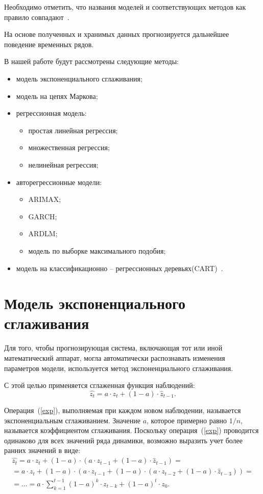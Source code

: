 Необходимо отметить, что названия моделей и соответствующих методов как правило совпадают~\cite{myref9}.

На основе полученных и хранимых данных прогнозируется дальнейшее поведение временных рядов.

В нашей работе будут рассмотрены следующие методы:

\begin{itemize}
\item модель экспоненциального сглаживания;
\item модель на цепях Маркова;
\item регрессионная модель:
    \begin{itemize}
        \item простая линейная регрессия;
        \item множественная регрессия;
        \item нелинейная регрессия;
    \end{itemize}
\item авторегрессионные модели:
\begin{itemize}
    \item ARIMAX;
    \item GARCH;
    \item ARDLM;
    \item модель по выборке максимального подобия;
\end{itemize}
\item модель на классификационно -- регрессионных деревьях(CART)~\cite{myref9}.
\end{itemize}

\section{Модель экспоненциального сглаживания}

Для того, чтобы прогнозирующая система, включающая тот или иной математический аппарат,
могла автоматически распознавать изменения параметров модели, используется метод экспоненциального сглаживания.

С этой целью применяется сглаженная функция наблюдений:
\begin{equation}
    \label{exp}
    \hat{z_t} = a \cdot z_t + (1 - a) \cdot \widehat{z}_{t-1}.
\end{equation}

Операция~(\ref{exp}), выполняемая при каждом новом наблюдении, называется экспоненциальным сглаживанием.
Значение $a$, которое примерно равно $1/n$, называется коэффициентом сглаживания.
Поскольку операция~(\ref{exp}) проводится одинаково для всех значений ряда динамики, возможно выразить учет более ранних значений в виде:
\begin{multline}
    \label{exp1}
    \hat{z_t} = a \cdot z_t + (1 - a) \cdot (a \cdot z_{t-1} + (1 - a) \cdot \widehat{z}_{t-1}) =\\
    = a \cdot z_t + (1 - a) \cdot (a \cdot z_{t-1} + (1 - a) \cdot(a \cdot z_{t-2} + (1 - a) \cdot \widehat{z}_{t-3})) =\\
    = \ldots = a \cdot \sum_{k=1}^{t-1}(1-a)^k \cdot z_{t-k} + (1-a)^t \cdot z_0.
\end{multline}

